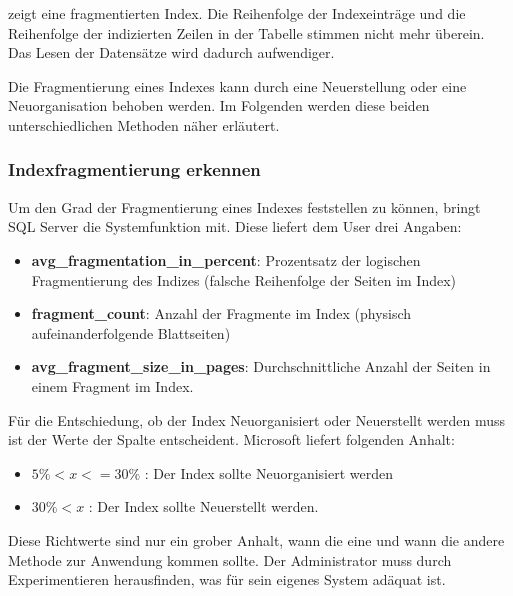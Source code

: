          zeigt eine fragmentierten Index. Die
        Reihenfolge der Indexeinträge und die Reihenfolge der indizierten Zeilen
        in der Tabelle stimmen nicht mehr überein. Das Lesen der Datensätze wird
        dadurch aufwendiger.
        
        Die Fragmentierung eines Indexes kann durch eine Neuerstellung oder eine
        Neuorganisation behoben werden. Im Folgenden werden diese beiden
        unterschiedlichen Methoden näher erläutert.
        \subsubsection{Indexfragmentierung erkennen}
          Um den Grad der Fragmentierung eines Indexes feststellen zu können,
          bringt SQL Server die Systemfunktion
           mit. Diese liefert dem
          User drei Angaben:
          \begin{itemize}
            \item \textbf{avg\_fragmentation\_in\_percent}: Prozentsatz der
            logischen Fragmentierung des Indizes (falsche Reihenfolge der Seiten
            im Index)
            \item \textbf{fragment\_count}: Anzahl der Fragmente im Index
            (physisch aufeinanderfolgende Blattseiten)
            \item \textbf{avg\_fragment\_size\_in\_pages}: Durchschnittliche
            Anzahl der Seiten in einem Fragment im Index.
          \end{itemize}
          Für die Entschiedung, ob der Index Neuorganisiert oder Neuerstellt
          werden muss ist der Werte der Spalte
           entscheident. Microsoft
          liefert folgenden Anhalt:
          \begin{itemize}
            \item $5 \% < x <= 30 \% $ : Der Index sollte Neuorganisiert werden
            \item $30 \% < x$ : Der Index sollte Neuerstellt werden.
          \end{itemize}
          \begin{merke}
            Diese Richtwerte sind nur ein grober Anhalt, wann die eine und wann
            die andere Methode zur Anwendung kommen sollte. Der Administrator
            muss durch Experimentieren herausfinden, was für sein eigenes System
            adäquat ist.
          \end{merke}
